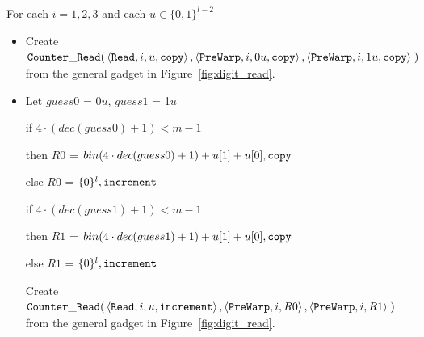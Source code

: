 For each $i = 1,2,3$ and each $u \in \{0, 1\}^{l-2}$
\begin{itemize}

    \item Create
        $\begin{aligned}[t]
            {\tt Counter\_Read}(& \left\langle {\tt Read},    i,  u, {\tt copy} \right\rangle,
                       \left\langle {\tt PreWarp}, i, 0u, {\tt copy} \right\rangle,
                       \left\langle {\tt PreWarp}, i, 1u, {\tt copy} \right\rangle \;)
        \end{aligned}$\\from the general gadget in Figure~\ref{fig:digit_read}.

    \item Let $guess0$ = 0$u$, $guess1$ = 1$u$

    if $4 \cdot (dec(guess0) + 1) < m - 1$

    then $R0$ = $bin(4 \cdot dec(guess0) + 1)+u[1]+u[0], {\tt copy}$

    else $R0$ = $\{0 \}^l, {\tt increment}$

    \vspace{.5cm}

    if $4 \cdot (dec(guess1) + 1) < m - 1$

    then $R1$ = $bin(4 \cdot dec(guess1) + 1)+u[1]+u[0], {\tt copy}$

    else $R1$ = $\{0 \}^l, {\tt increment}$

    \vspace{.5cm}

    Create
    $\begin{aligned}[t]
        {\tt Counter\_Read}(& \left\langle {\tt Read},    i,  u, {\tt increment} \right\rangle,
                   \left\langle {\tt PreWarp}, i, R0 \right\rangle,
                   \left\langle {\tt PreWarp}, i, R1 \right\rangle \;)
    \end{aligned}$\\from the general gadget in Figure~\ref{fig:digit_read}.

\end{itemize}

